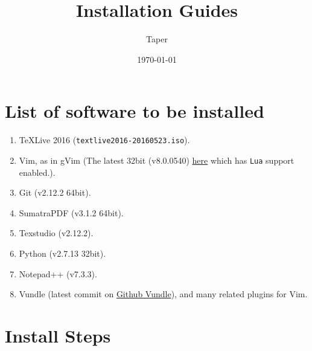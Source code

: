 \documentclass{article}
\title{Installation Guides}
\date{\today}
\author{Taper}
\begin{document}
\maketitle
{}    
\tableofcontents

\section{List of software to be installed}
\label{sec:list of software}

\begin{enumerate}
    \item \TeX Live 2016 (\texttt{textlive2016-20160523.iso}).
    \item Vim, as in gVim
        (The latest 32bit (v8.0.0540)
        \href{https://github.com/vim/vim-win32-installer/releases/}{here}
        which has \texttt{Lua} support enabled.).
    \item Git (v2.12.2 64bit).
    \item SumatraPDF (v3.1.2 64bit).
    \item Texstudio (v2.12.2).
    \item Python (v2.7.13 32bit).
    \item Notepad++ (v7.3.3).
    \item Vundle (latest commit on
        \href{https://github.com/VundleVim/Vundle.vim}{Github
        Vundle}), and many related plugins for Vim.
\end{enumerate}

\section{Install Steps}
\label{sec:Install Steps}
\end{document}
